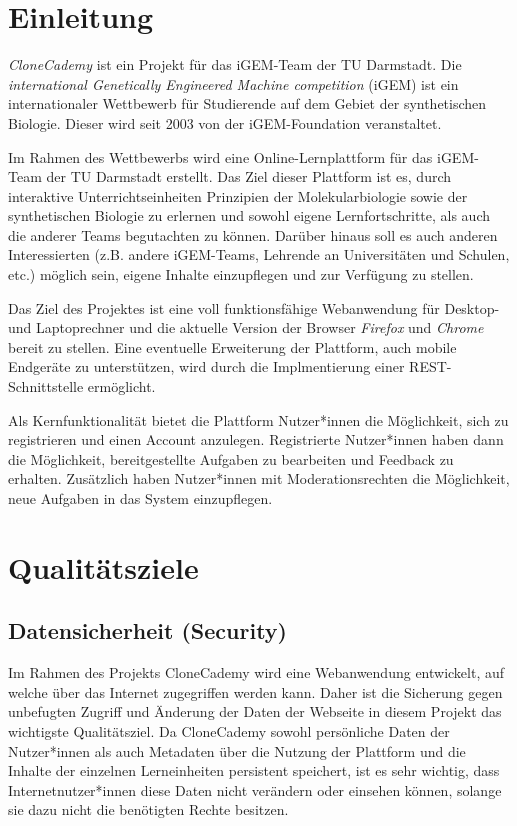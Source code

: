 \chapter{Einleitung}

\emph{CloneCademy} ist ein Projekt für das iGEM-Team der TU Darmstadt. Die \emph{international Genetically Engineered Machine competition} (iGEM) ist ein internationaler Wettbewerb für Studierende auf dem Gebiet der synthetischen Biologie.
Dieser wird seit 2003 von der iGEM-Foundation veranstaltet.

Im Rahmen des Wettbewerbs wird eine Online-Lernplattform für das iGEM-Team der TU Darmstadt erstellt. Das Ziel dieser Plattform ist es, durch interaktive Unterrichtseinheiten Prinzipien der Molekularbiologie sowie der synthetischen Biologie zu erlernen und sowohl eigene Lernfortschritte, als auch die anderer Teams begutachten zu können. Darüber hinaus soll es auch anderen Interessierten (z.B. andere iGEM-Teams, Lehrende an Universitäten und Schulen, etc.) möglich sein, eigene Inhalte einzupflegen und zur Verfügung zu stellen.

Das Ziel des Projektes ist eine voll funktionsfähige Webanwendung für Desktop- und Laptoprechner und die aktuelle Version der Browser \emph{Firefox} und \emph{Chrome} bereit zu stellen. Eine eventuelle Erweiterung der Plattform, auch mobile Endgeräte zu unterstützen, wird durch die Implmentierung einer REST-Schnittstelle ermöglicht.

Als Kernfunktionalität bietet die Plattform Nutzer*innen die Möglichkeit, sich zu registrieren und einen Account anzulegen. Registrierte Nutzer*innen haben dann die Möglichkeit, bereitgestellte Aufgaben zu bearbeiten und Feedback zu erhalten. Zusätzlich haben Nutzer*innen mit Moderationsrechten die Möglichkeit, neue Aufgaben in das System einzupflegen.


\chapter{Qualitätsziele}
\section{Datensicherheit (Security)}

Im Rahmen des Projekts CloneCademy wird eine Webanwendung entwickelt, auf welche über das Internet zugegriffen werden kann. Daher ist die Sicherung gegen unbefugten Zugriff und Änderung der Daten der Webseite in diesem Projekt das wichtigste Qualitätsziel. Da CloneCademy sowohl persönliche Daten der Nutzer*innen als auch Metadaten über die Nutzung der Plattform und die Inhalte der einzelnen Lerneinheiten persistent speichert, ist es sehr wichtig, dass Internetnutzer*innen diese Daten nicht verändern oder einsehen können, solange sie dazu nicht die benötigten Rechte besitzen.

